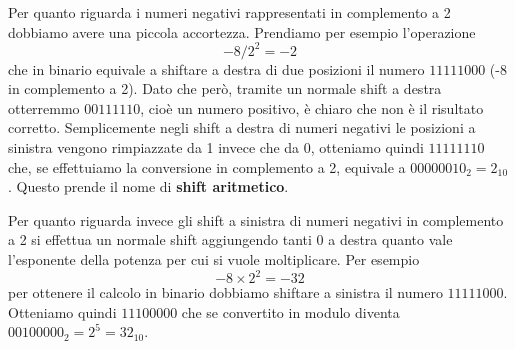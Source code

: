 Per quanto riguarda i numeri negativi rappresentati in complemento a 2 dobbiamo avere una piccola
accortezza. Prendiamo per esempio l'operazione
\[ -8 / 2^2 = -2 \]
che in binario equivale a shiftare a destra di due posizioni il numero $11111000$ (-8 in
complemento a 2). Dato che però, tramite un normale shift a destra otterremmo $00111110$, cioè un
numero positivo, è chiaro che non è il risultato corretto. Semplicemente negli shift a destra di
numeri negativi le posizioni a sinistra vengono rimpiazzate da 1 invece che da 0, otteniamo quindi
$11111110$ che, se effettuiamo la conversione in complemento a 2, equivale a $00000010_2 = 2_{10}$.
Questo prende il nome di \textbf{shift aritmetico}.

Per quanto riguarda invece gli shift a sinistra di numeri negativi in complemento a 2 si effettua
un normale shift aggiungendo tanti 0 a destra quanto vale l'esponente della potenza per cui si
vuole moltiplicare. Per esempio
\[ -8 \times 2^2 = -32 \]
per ottenere il calcolo in binario dobbiamo shiftare a sinistra il numero $11111000$. Otteniamo
quindi $11100000$ che se convertito in modulo diventa $00100000_2 = 2^5 = 32_{10}$.